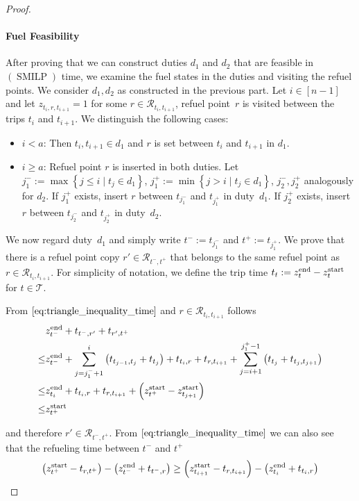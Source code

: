 \begin{proof}
\paragraph{Fuel Feasibility} \proofparfill

After proving that we can construct duties $d_1$ and $d_2$ that are feasible in $(\operatorname{SMILP})$ \wrt time, we examine the fuel states in the duties and visiting the refuel points. We consider $d_1,d_2$ as constructed in the previous part. Let $i\in[n-1]$ and let ${z_{t_i,r,t_{i+1}}=1}$ for some ${r\in\mathcal{R}_{t_i,t_{i+1}}}$, \ie refuel point~$r$ is visited between the trips $t_i$ and $t_{i+1}$. We distinguish the following cases:
\begin{itemize}
	\item{$i<a$:}
		Then ${t_i,t_{i+1}\in d_1}$ and $r$ is set between $t_i$ and $t_{i+1}$ in $d_1$.
	\item{$i\geq a$:}
		Refuel point $r$ is inserted in both duties. Let ${j^-_1:=\max\left\{j\leq i\mid t_j\in d_1\right\}}$, ${j^+_1:=\min\left\{j>i\mid t_j\in d_1\right\}}$, $j^-_2,j^+_2$ analogously for $d_2$. If $j^+_1$ exists, insert $r$ between $t_{j^-_1}$ and $t_{j^+_1}$ in duty~$d_1$. If $j^+_2$ exists, insert $r$ between $t_{j^-_2}$ and $t_{j^+_2}$ in duty~$d_2$.
\end{itemize}

We now regard duty~$d_1$ and simply write ${t^-:=t_{j^-_1}}$ and ${t^+:=t_{j^+_1}}$. We prove that there is a refuel point copy ${r'\in\mathcal{R}_{t^-,t^+}}$ that belongs to the same refuel point as ${r\in\mathcal{R}_{t_i,t_{i+1}}}$. For simplicity of notation, we define the trip time ${t_t := z^{\operatorname{end}}_{t} - z^{\operatorname{start}}_{t}}$ for ${t\in\mathcal{T}}$.

From $\eqref{eq:triangle_inequality_time}$ and ${r\in\mathcal{R}_{t_i,t_{i+1}}}$ follows
\begin{align*}
	& z^{\operatorname{end}}_{t^-} + t_{t^-,r'} + t_{r',t^+} \\
	\leq & z^{\operatorname{end}}_{t^-} + \sum_{j=j^-_1+1}^i \left(t_{t_{j-1},t_{j}} + t_{t_j}\right) + t_{t_i,r} + t_{r,t_{i+1}} + \sum_{j=i+1}^{j^+_1-1} \left(t_{t_j} + t_{t_{j},t_{j+1}}\right) \\
	\leq & z^{\operatorname{end}}_{t_i} + t_{t_i,r} + t_{r,t_{i+1}} + \left(z^{\operatorname{start}}_{t^+} - z^{\operatorname{start}}_{t_{j+1}}\right) \\
	\leq & z^{\operatorname{start}}_{t^+}
\end{align*}

and therefore ${r'\in\mathcal{R}_{t^-,t^+}}$. From $\eqref{eq:triangle_inequality_time}$ we can also see that the refueling time between $t^-$ and $t^+$
\begin{align*}
	\left(z^{\operatorname{start}}_{t^+} - t_{r,t^+}\right) - \left(z^{\operatorname{end}}_{t^-} + t_{t^-,r}\right) \geq \left(z^{\operatorname{start}}_{t_{i+1}} - t_{r,t_{i+1}}\right) - \left(z^{\operatorname{end}}_{t_i} + t_{t_i,r}\right)
\end{align*}


\end{proof}

